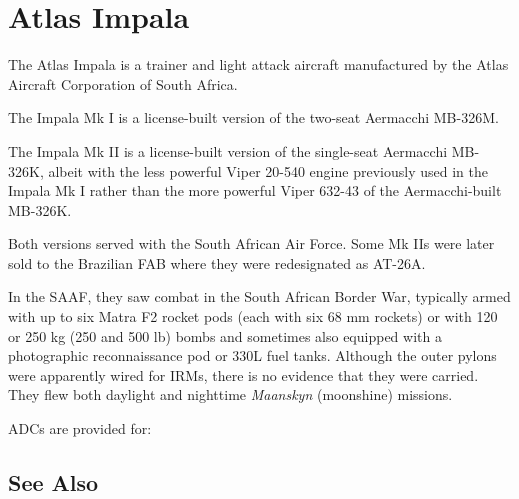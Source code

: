 \section{Atlas Impala}

The Atlas Impala is a trainer and light attack aircraft manufactured by the Atlas Aircraft Corporation of South Africa.

The Impala Mk I is a license-built version of the two-seat Aermacchi MB-326M.

The Impala Mk II is a license-built version of the single-seat Aermacchi MB-326K, albeit with the less powerful Viper 20-540 engine previously used in the Impala Mk I rather than the more powerful Viper 632-43 of the Aermacchi-built MB-326K.

Both versions served with the South African Air Force. Some Mk IIs were later sold to the Brazilian FAB where they were redesignated as AT-26A.

In the SAAF, they saw combat in the South African Border War, typically armed with up to six Matra F2 rocket pods (each with six 68 mm rockets) or with 120 or 250 kg (250 and 500 lb) bombs and sometimes also equipped with a photographic reconnaissance pod or 330L fuel tanks. Although the outer pylons were apparently wired for IRMs, there is no evidence that they were carried. They flew both daylight and nighttime {\itshape Maanskyn} (moonshine) missions.

ADCs are provided for:
\begin{adclist}
\end{adclist}

\subsection{See Also}
\begin{typelist}
\end{typelist}